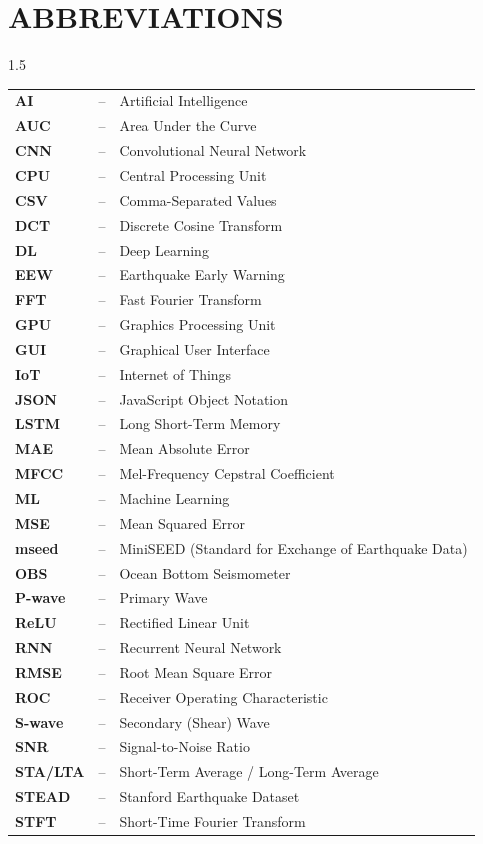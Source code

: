 \documentclass[a4paper,12pt]{report}
\begin{document}
\begingroup
\let\clearpage\relax
\let\cleardoublepage\relax
\chapter*{ABBREVIATIONS}
\endgroup
{}
\fontsize{12pt}{18pt}\selectfont
\begin{spacing}{1.5}
\begin{tabular}{p{3.5cm} p{0.5cm} p{10cm}}
\textbf{AI}   & -- & Artificial Intelligence \\
\textbf{AUC}  & -- & Area Under the Curve \\
\textbf{CNN}  & -- & Convolutional Neural Network \\
\textbf{CPU}  & -- & Central Processing Unit \\
\textbf{CSV}  & -- & Comma-Separated Values \\
\textbf{DCT}  & -- & Discrete Cosine Transform \\
\textbf{DL}   & -- & Deep Learning \\
\textbf{EEW}  & -- & Earthquake Early Warning \\
\textbf{FFT}  & -- & Fast Fourier Transform \\
\textbf{GPU}  & -- & Graphics Processing Unit \\
\textbf{GUI}  & -- & Graphical User Interface \\
\textbf{IoT}  & -- & Internet of Things \\
\textbf{JSON} & -- & JavaScript Object Notation \\
\textbf{LSTM} & -- & Long Short-Term Memory \\
\textbf{MAE}  & -- & Mean Absolute Error \\
\textbf{MFCC} & -- & Mel-Frequency Cepstral Coefficient \\
\textbf{ML}   & -- & Machine Learning \\
\textbf{MSE}  & -- & Mean Squared Error \\
\textbf{mseed}& -- & MiniSEED (Standard for Exchange of Earthquake Data) \\
\textbf{OBS}  & -- & Ocean Bottom Seismometer \\
\textbf{P-wave}& -- & Primary Wave \\
\textbf{ReLU} & -- & Rectified Linear Unit \\
\textbf{RNN}  & -- & Recurrent Neural Network \\
\textbf{RMSE} & -- & Root Mean Square Error \\
\textbf{ROC}  & -- & Receiver Operating Characteristic \\
\textbf{S-wave}& -- & Secondary (Shear) Wave \\
\textbf{SNR}  & -- & Signal-to-Noise Ratio \\
\textbf{STA/LTA}& -- & Short-Term Average / Long-Term Average \\
\textbf{STEAD}& -- & Stanford Earthquake Dataset \\
\textbf{STFT} & -- & Short-Time Fourier Transform \\
\end{tabular}
\end{spacing}
\newpage
\end{document}
